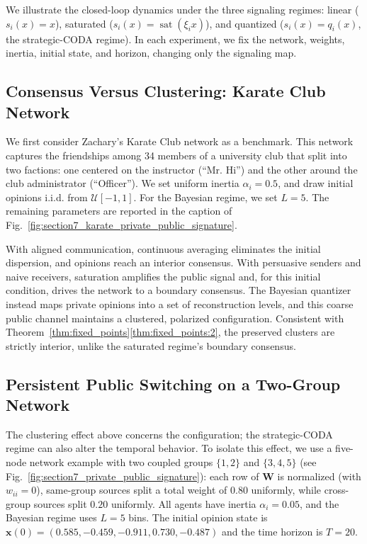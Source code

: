 \documentclass[journal,twoside,web]{ieeecolor}
\begin{document}
We illustrate the closed-loop dynamics under the three signaling regimes: linear ($s_i(x)=x$), saturated ($s_i(x)=\operatorname{sat}(\xi_i x)$), and quantized ($s_i(x)=q_i(x)$, the strategic-CODA regime). In each experiment, we fix the network, weights, inertia, initial state, and horizon, changing only the signaling map.

\subsection{Consensus Versus Clustering: Karate Club Network}
\label{subsec:karate}

We first consider Zachary's Karate Club network \cite{zachary1977information} as a benchmark. This network captures the friendships among 34 members of a university club that split into two factions: one centered on the instructor (``Mr. Hi'') and the other around the club administrator (``Officer''). We set uniform inertia $\alpha_i=0.5$, and draw initial opinions i.i.d. from $\mathcal{U}[-1,1]$. For the Bayesian regime, we set $L=5$. The remaining parameters are reported in the caption of Fig.~\ref{fig:section7_karate_private_public_signature}.

With aligned communication, continuous averaging eliminates the initial dispersion, and opinions reach an interior consensus. With persuasive senders and naive receivers, saturation amplifies the public signal and, for this initial condition, drives the network to a boundary consensus. The Bayesian quantizer instead maps private opinions into a set of reconstruction levels, and this coarse public channel maintains a clustered, polarized configuration. Consistent with Theorem~\ref{thm:fixed_points}\ref{thm:fixed_points:2}, the preserved clusters are strictly interior, unlike the saturated regime's boundary consensus.

\subsection{Persistent Public Switching on a Two-Group Network}
\label{subsec:switching}

The clustering effect above concerns the configuration; the strategic-CODA regime can also alter the temporal behavior. To isolate this effect, we use a five-node network example with two coupled groups $\{1,2\}$ and $\{3,4,5\}$ (see Fig.~\ref{fig:section7_private_public_signature}): each row of $\bm W$ is normalized (with $w_{ii}=0$), same-group sources split a total weight of $0.80$ uniformly, while cross-group sources split $0.20$ uniformly. All agents have inertia $\alpha_i=0.05$, and the Bayesian regime uses $L=5$ bins. The initial opinion state is $\bm{x}(0)=(0.585,-0.459,-0.911,0.730,-0.487)$ and the time horizon is $T=20$.
\end{document}
